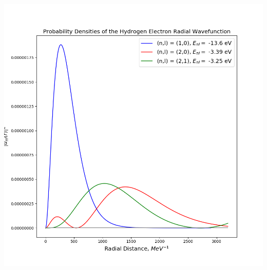 \documentclass[mathserif, 10pt,usenames,dvipsnames]{beamer}
\begin{document}
\begin{frame}
\begin{columns}[c]
\begin{center}
            \includegraphics[scale=0.2]{images/probs.png}
        \end{center}
        \end{columns}
\end{frame}
\end{document}

